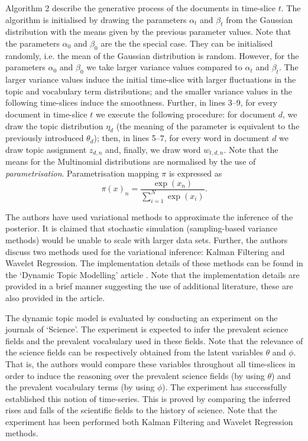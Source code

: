\documentclass{mprop}
\begin{document}
Algorithm 2 describe the generative process of the documents in time-slice $t$. The algorithm is initialised by drawing the parameters $\alpha_t$ and $\beta_t$ from the Gaussian distribution with the means given by the previous parameter values. Note that the parameters $\alpha_0$ and $\beta_0$ are the the special case. They can be initialised randomly, i.e. the mean of the Gaussian distribution is random. However, for the parameters $\alpha_0$ and $\beta_0$ we take larger variance values compared to $\alpha_t$ and $\beta_t$. The larger variance values  induce the initial time-slice with larger fluctuations in the topic and vocabulary term distributions; and the smaller variance values in the following time-slices induce the smoothness. Further, in lines 3--9, for every document in time-slice $t$ we execute the following procedure: for document $d$, we draw the topic distribution $\eta_d$ (the meaning of the parameter is equivalent to the previously introduced $\theta_d$); then, in lines 5--7, for every word in document $d$ we draw topic assignment $z_{d, n}$ and, finally, we draw word $w_{t, d, n}$. Note that the means for the Multinomial distributions are normalised by the use of \textit{parametrisation}. Parametrisation mapping $\pi$ is expressed as
\begin{equation}
\pi(x)_n = \dfrac{\exp{(x_n)}}{\sum^N_{i=1}\exp{(x_i)}}.
\end{equation}

\par The authors have used variational methods to approximate the inference of the posterior. It is claimed that stochastic simulation (sampling-based variance methods) would be unable to scale with larger data sets. Further, the authors discuss two methods used for the variational inference: Kalman Filtering and Wavelet Regression. The implementation details of these methods can be found in the `Dynamic Topic Modelling' article \cite{blei_2006}. Note that the implementation details are provided in a brief manner suggesting the use of additional literature, these are also provided in the article. 

\par The dynamic topic model is evaluated by conducting an experiment on the journals of `Science'. The experiment is expected to infer the prevalent science fields and the prevalent vocabulary used in these fields. Note that the relevance of the science fields can be respectively obtained from the latent variables $\theta$ and $\phi$. That is, the authors would compare these variables throughout all time-slices in order to induce the reasoning over the prevalent science fields (by using $\theta$) and the prevalent vocabulary terms (by using $\phi$). The experiment has successfully established this notion of time-series. This is proved by comparing the inferred rises and falls of the scientific fields to the history of science. Note that the experiment has been performed both Kalman Filtering and Wavelet Regression methods. 
\end{document}
